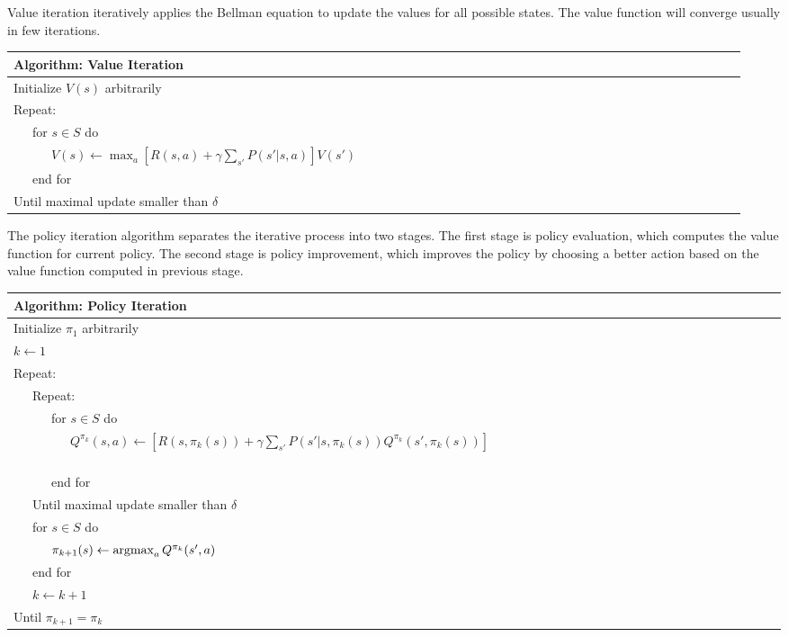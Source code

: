 Value iteration iteratively applies the Bellman equation to update the
values for all possible states. The value function will converge
usually in few iterations. 

\begin{center}
\begin{tabular}{@{}lp{6cm}@{}}
\hline
Algorithm: Value Iteration\\
\hline
Initialize $V(s)$ arbitrarily\\
Repeat:\\
\ \ \ for $s \in S$ do\\
\ \ \ \ \ \ $V(s) \leftarrow \max_a [R(s, a) + \gamma \sum_{s'} P(s'|s, a)]V(s')$\ \ \ \ \ \ \ \ \ \ \ \ \ \ \ \ \ \ \ \ \ \ \ \ \ \ \ \ \ \ \ \ \ \ \ \ \ \ \ \ \ \ \ \ \ \ \ \ \ \ \ \ \ \ \ \ \ \ \\
\ \ \ end for\\
Until maximal update smaller than $\delta$\\
\hline  
\end{tabular}
\end{center}

The policy iteration algorithm separates the iterative process into two stages. The first stage is policy evaluation, which computes the value function for
current policy. The second stage is policy improvement, which improves the
policy by choosing a better action based on the value function computed in
previous stage.

\begin{center}
\begin{tabular}{@{}lp{6cm}@{}}
\hline
Algorithm: Policy Iteration\\
\hline
Initialize $\pi_1$ arbitrarily\\
$k \leftarrow 1$\\
Repeat:\\
\ \ \ Repeat:\\
\ \ \ \ \ \ for $s \in S$ do\\
\ \ \ \ \ \ \ \ \ $Q^{\pi_k}(s, a) \leftarrow [R(s, \pi_k(s)) + \gamma \sum_{s'} P(s'|s, \pi_k(s)) Q^{\pi_k}(s', \pi_k(s))]$\ \ \ \ \ \ \ \ \ \ \ \ \ \ \ \ \ \ \ \ \ \ \ \ \ \ \ \ \ \ \ \ \ \ \ \ \ \ \ \ \ \ \ \ \ \ \ \ \\
\ \ \ \ \ \ end for\\
\ \ \ Until maximal update smaller than $\delta$\\
\ \ \ for $s \in S$ do\\
\ \ \ \ \ \ $\pi_{k+1}(s) \leftarrow \argmax_a Q^{\pi_k}(s', a)$\\
\ \ \ end for\\
\ \ \ $k \leftarrow k + 1$\\
Until $\pi_{k+1} = \pi_{k}$\\
\hline  
\end{tabular}
\end{center}

